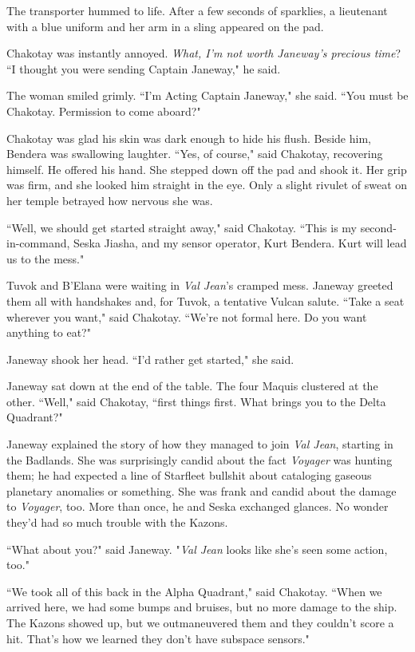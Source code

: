 \documentclass[twoside,letterpaper,12pt]{memoir}
\begin{document}
The transporter hummed to life. After a few seconds of sparklies, a lieutenant with a blue uniform and her arm in a sling appeared on the pad.

Chakotay was instantly annoyed. \textit{What, I'm not worth Janeway's precious time}? ``I thought you were sending Captain Janeway," he said.

The woman smiled grimly. ``I'm Acting Captain Janeway," she said. ``You must be Chakotay. Permission to come aboard?"

Chakotay was glad his skin was dark enough to hide his flush. Beside him, Bendera was swallowing laughter. ``Yes, of course," said Chakotay, recovering himself. He offered his hand. She stepped down off the pad and shook it. Her grip was firm, and she looked him straight in the eye. Only a slight rivulet of sweat on her temple betrayed how nervous she was.

``Well, we should get started straight away," said Chakotay. ``This is my second-in-command, Seska Jiasha, and my sensor operator, Kurt Bendera. Kurt will lead us to the mess."

Tuvok and B'Elana were waiting in \textit{Val Jean}'s cramped mess. Janeway greeted them all with handshakes and, for Tuvok, a tentative Vulcan salute. ``Take a seat wherever you want," said Chakotay. ``We're not formal here. Do you want anything to eat?"

Janeway shook her head. ``I'd rather get started," she said.

Janeway sat down at the end of the table. The four Maquis clustered at the other. ``Well," said Chakotay, ``first things first. What brings you to the Delta Quadrant?"

Janeway explained the story of how they managed to join \textit{Val Jean}, starting in the Badlands. She was surprisingly candid about the fact \textit{Voyager} was hunting them; he had expected a line of Starfleet bullshit about cataloging gaseous planetary anomalies or something. She was frank and candid about the damage to \textit{Voyager}, too. More than once, he and Seska exchanged glances. No wonder they'd had so much trouble with the Kazons.

``What about you?" said Janeway. "\textit{Val Jean} looks like she's seen some action, too."

``We took all of this back in the Alpha Quadrant," said Chakotay. ``When we arrived here, we had some bumps and bruises, but no more damage to the ship. The Kazons showed up, but we outmaneuvered them and they couldn't score a hit. That's how we learned they don't have subspace sensors."
\end{document}
